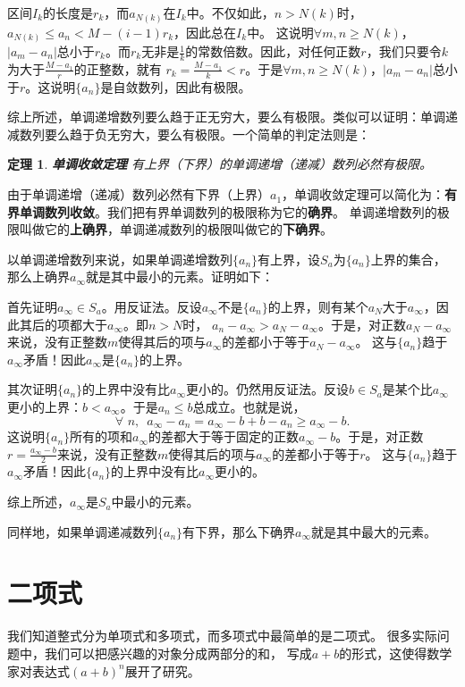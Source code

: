 \documentclass[12pt,UTF8]{ctexbook}
\newtheorem{tm}{定理}[section]
\begin{document}
区间$I_k$的长度是$r_k$，而$a_{N(k)}$在$I_k$中。不仅如此，$n>N(k)$时，$a_{N(k)} \leqslant a_n < M - (i-1)r_k$，因此总在$I_k$中。
这说明$\forall m,n\geqslant N(k)$，$|a_m - a_n|$总小于$r_k$。而$r_k$无非是$\frac1k$的常数倍数。因此，对任何正数$r$，我们只要令$k$为大于$\frac{M - a_1}{r}$的正整数，就有
$r_k = \frac{M - a_1}{k} < r$。于是$\forall m,n\geqslant N(k)$，$|a_m - a_n|$总小于$r$。这说明$\{a_n\}$是自敛数列，因此有极限。

综上所述，单调递增数列要么趋于正无穷大，要么有极限。类似可以证明：单调递减数列要么趋于负无穷大，要么有极限。一个简单的判定法则是：
\begin{tm}\textbf{单调收敛定理}
    有上界（下界）的单调递增（递减）数列必然有极限。
\end{tm}
由于单调递增（递减）数列必然有下界（上界）$a_1$，单调收敛定理可以简化为：\textbf{有界单调数列收敛}。我们把有界单调数列的极限称为它的\textbf{确界}。
单调递增数列的极限叫做它的\textbf{上确界}，单调递减数列的极限叫做它的\textbf{下确界}。

以单调递增数列来说，如果单调递增数列$\{a_n\}$有上界，设$S_a$为$\{a_n\}$上界的集合，那么上确界$a_\infty$就是其中最小的元素。证明如下：

首先证明$a_\infty \in S_a$。用反证法。反设$a_\infty$不是$\{a_n\}$的上界，则有某个$a_N$大于$a_\infty$，因此其后的项都大于$a_\infty$。即$n > N$时，
$a_n - a_\infty > a_N - a_\infty$。于是，对正数$a_N - a_\infty$来说，没有正整数$m$使得其后的项与$a_\infty$的差都小于等于$a_N - a_\infty$。
这与$\{a_n\}$趋于$a_\infty$矛盾！因此$a_\infty$是$\{a_n\}$的上界。

其次证明$\{a_n\}$的上界中没有比$a_\infty$更小的。仍然用反证法。反设$b \in S_a$是某个比$a_\infty$更小的上界：$b < a_\infty$。于是$a_n \leqslant b$总成立。也就是说，
$$\forall \,\, n, \,\,\, a_\infty - a_n = a_\infty - b + b - a_n \geqslant a_\infty - b.$$
这说明$\{a_n\}$所有的项和$a_\infty$的差都大于等于固定的正数$a_\infty - b$。于是，对正数$r = \frac{a_\infty - b}{2}$来说，没有正整数$m$使得其后的项与$a_\infty$的差都小于等于$r$。
这与$\{a_n\}$趋于$a_\infty$矛盾！因此$\{a_n\}$的上界中没有比$a_\infty$更小的。

综上所述，$a_\infty$是$S_a$中最小的元素。

同样地，如果单调递减数列$\{a_n\}$有下界，那么下确界$a_\infty$就是其中最大的元素。 

\chapter{二项式}

我们知道整式分为单项式和多项式，而多项式中最简单的是二项式。
很多实际问题中，我们可以把感兴趣的对象分成两部分的和，
写成$a+b$的形式，这使得数学家对表达式$(a+b)^n$展开了研究。
\end{document}
